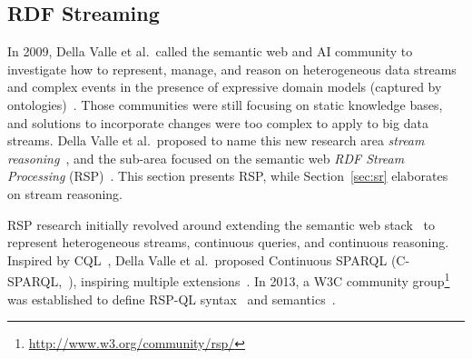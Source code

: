 \subsection{RDF Streaming}\label{sec:rdf} %

In 2009, Della Valle et al.\ called the semantic web and AI community
to investigate how to represent, manage, and reason on heterogeneous
data streams and complex events in the presence of expressive domain
models (captured by ontologies)~\cite{DBLP:journals/expert/ValleCHF09}.
Those communities were still focusing on static knowledge bases, and
solutions to incorporate changes were too complex to apply to big data
streams.  Della Valle et al.\ proposed to name this new research area
\emph{stream reasoning}~\cite{DellAglioDataScience2017}, and 
the sub-area focused on the semantic web \emph{RDF
  Stream Processing} (RSP)~\cite{DBLP:conf/debs/ValleDM16}. This
section presents RSP, while Section~\ref{sec:sr} elaborates on stream
reasoning.


\sloppy RSP research initially revolved around extending the
semantic web stack~\cite{DBLP:books/daglib/0036180} to represent
heterogeneous streams, continuous queries, and continuous
reasoning. Inspired by CQL~\cite{arasu_widom_2004}, Della Valle et
al.\ proposed Continuous SPARQL
(\textsf{C-SPARQL},~\cite{DBLP:conf/fis/ValleCBBC08}), inspiring multiple
extensions~\cite{DBLP:journals/semweb/AnicicRFS12,Calbimonte2010,LePhuoc2012c}.
In 2013, a W3C community
group\footnote{\url{http://www.w3.org/community/rsp/}} was established
to define \textsf{RSP-QL} syntax~\cite{DBLP:conf/esws/DellAglioCVC15}
and semantics~\cite{DBLP:journals/ijswis/DellAglioVCC14}.


